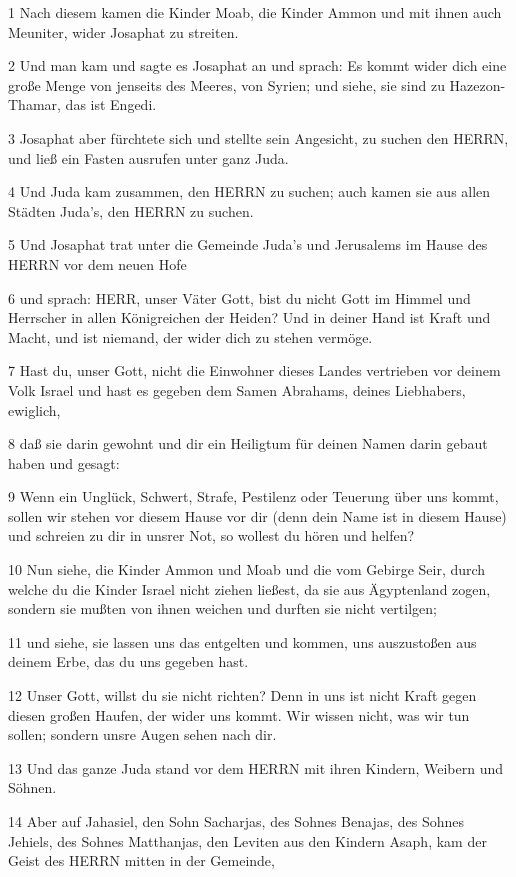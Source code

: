 \par 1 Nach diesem kamen die Kinder Moab, die Kinder Ammon und mit ihnen auch Meuniter, wider Josaphat zu streiten.
\par 2 Und man kam und sagte es Josaphat an und sprach: Es kommt wider dich eine große Menge von jenseits des Meeres, von Syrien; und siehe, sie sind zu Hazezon-Thamar, das ist Engedi.
\par 3 Josaphat aber fürchtete sich und stellte sein Angesicht, zu suchen den HERRN, und ließ ein Fasten ausrufen unter ganz Juda.
\par 4 Und Juda kam zusammen, den HERRN zu suchen; auch kamen sie aus allen Städten Juda's, den HERRN zu suchen.
\par 5 Und Josaphat trat unter die Gemeinde Juda's und Jerusalems im Hause des HERRN vor dem neuen Hofe
\par 6 und sprach: HERR, unser Väter Gott, bist du nicht Gott im Himmel und Herrscher in allen Königreichen der Heiden? Und in deiner Hand ist Kraft und Macht, und ist niemand, der wider dich zu stehen vermöge.
\par 7 Hast du, unser Gott, nicht die Einwohner dieses Landes vertrieben vor deinem Volk Israel und hast es gegeben dem Samen Abrahams, deines Liebhabers, ewiglich,
\par 8 daß sie darin gewohnt und dir ein Heiligtum für deinen Namen darin gebaut haben und gesagt:
\par 9 Wenn ein Unglück, Schwert, Strafe, Pestilenz oder Teuerung über uns kommt, sollen wir stehen vor diesem Hause vor dir (denn dein Name ist in diesem Hause) und schreien zu dir in unsrer Not, so wollest du hören und helfen?
\par 10 Nun siehe, die Kinder Ammon und Moab und die vom Gebirge Seir, durch welche du die Kinder Israel nicht ziehen ließest, da sie aus Ägyptenland zogen, sondern sie mußten von ihnen weichen und durften sie nicht vertilgen;
\par 11 und siehe, sie lassen uns das entgelten und kommen, uns auszustoßen aus deinem Erbe, das du uns gegeben hast.
\par 12 Unser Gott, willst du sie nicht richten? Denn in uns ist nicht Kraft gegen diesen großen Haufen, der wider uns kommt. Wir wissen nicht, was wir tun sollen; sondern unsre Augen sehen nach dir.
\par 13 Und das ganze Juda stand vor dem HERRN mit ihren Kindern, Weibern und Söhnen.
\par 14 Aber auf Jahasiel, den Sohn Sacharjas, des Sohnes Benajas, des Sohnes Jehiels, des Sohnes Matthanjas, den Leviten aus den Kindern Asaph, kam der Geist des HERRN mitten in der Gemeinde,
